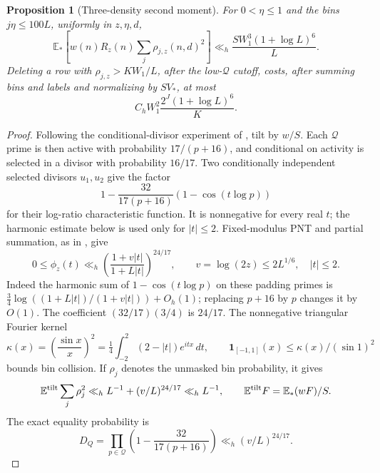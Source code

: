 \documentclass[11pt]{article}
\newtheorem{proposition}[theorem]{Proposition}
\theoremstyle{definition}
\newcommand{\E}{\mathbb E}
\newcommand{\ind}{\mathbf 1}
\theoremstyle{remark}
\numberwithin{equation}{section}
\newcommand{\Qset}{\mathcal Q}
\begin{document}
\begin{proposition}[Three-density second moment]\label{prop:collision}
For $0<\eta\le1$ and the bins $j\eta\le100L$, uniformly in $z,\eta,d$,
\begin{equation}\label{eq:masked-second}
 \E_*\left[w(n)R_z(n)\sum_j\rho_{j,z}(n,d)^2\right]
 \ll_h\frac{S W_1^3(1+\log L)^6}{L}.
\end{equation}
Deleting a row with $\rho_{j,z}>KW_1/L$, after the low-$\Qset$ cutoff, costs, after summing bins and labels and
normalizing by $SV_*$, at most
\begin{equation}\label{eq:masked-deletion}
 C_h W_1^2\frac{2^J(1+\log L)^6}{K}.
\end{equation}
\end{proposition}
\begin{proof}
Following the conditional-divisor experiment of \cite[Lemma~4.5, pp.~17--18]{OpenAI007}, tilt by $w/S$.
Each $\Qset$ prime is then active with probability $17/(p+16)$, and conditional on activity is selected in a
divisor with probability $16/17$. Two conditionally independent selected divisors $u_1,u_2$ give the factor
\begin{equation}\label{eq:collision-factor}
 1-\frac{32}{17(p+16)}(1-\cos(t\log p))
\end{equation}
for their log-ratio characteristic function. It is nonnegative for every real $t$; the harmonic estimate below is used only for $|t|\le2$.
Fixed-modulus PNT and partial summation, as in \cite[(4.11)--(4.13), pp.~17--18]{OpenAI007}, give
\begin{equation}\label{eq:collision-char}
 0\le\phi_z(t)\ll_h
 \left(\frac{1+v|t|}{1+L|t|}\right)^{24/17},\qquad v=\log(2z)\le2L^{1/6},\quad |t|\le2.
\end{equation}
Indeed the harmonic sum of $1-\cos(t\log p)$ on these padding primes is
$\tfrac34\log((1+L|t|)/(1+v|t|))+O_h(1)$; replacing $p+16$ by $p$ changes it by $O(1)$.
The coefficient $(32/17)(3/4)$ is $24/17$.
The nonnegative triangular Fourier kernel
\begin{equation}\label{eq:triangular}
 \kappa(x)=\left(\frac{\sin x}{x}\right)^2
 =\tfrac14\int_{-2}^2(2-|t|)e^{itx}\,dt,\qquad
 \ind_{[-1,1]}(x)\le\kappa(x)/(\sin1)^2
\end{equation}
bounds bin collision. If $\rho_j$ denotes the unmasked bin probability, it gives
\begin{equation}\label{eq:unmasked-collision}
 \E^{\rm tilt}\sum_j\rho_j^2\ll_h L^{-1}+(v/L)^{24/17}\ll_h L^{-1},\qquad
 \E^{\rm tilt}F=\E_*(wF)/S.
\end{equation}
The exact equality probability is
\begin{equation}\label{eq:diagonal-padding}
 D_Q=\prod_{p\in\Qset}\left(1-\frac{32}{17(p+16)}\right)\ll_h(v/L)^{24/17}.
\end{equation}


\end{proof}
\end{document}
